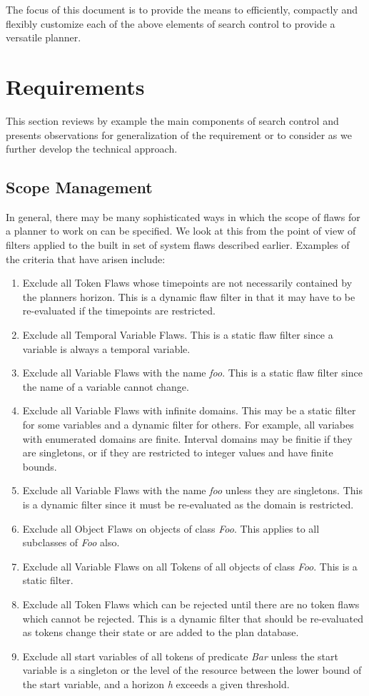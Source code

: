 \documentclass[10pt, letterpaper, twoside]{article}
\begin{document}
The focus of this document is to provide the means to efficiently, compactly and flexibly customize each of the above elements of search control to provide a versatile planner.

\section{Requirements}
This section reviews by example the main components of search control and presents observations for generalization of the requirement or to consider as we further develop the technical approach.

\subsection{Scope Management}
In general, there may be many sophisticated ways in which the scope of flaws for a planner to work on can be specified. We look at this from the point of view of filters applied to the built in set of system flaws described earlier. Examples of the criteria that have arisen include:
\begin{enumerate}
\item Exclude all Token Flaws whose timepoints are not necessarily contained by the planners horizon. This is a dynamic flaw filter in that it may have to be re-evaluated if the timepoints are restricted.
\item Exclude all Temporal Variable Flaws. This is a static flaw filter since a variable is always a temporal variable.
\item Exclude all Variable Flaws with the name {\em foo}. This is a static flaw filter since the name of a variable cannot change.
\item Exclude all Variable Flaws with infinite domains. This may be a static filter for some variables and a dynamic filter for others. For example, all variabes with enumerated domains are finite. Interval domains may be finitie if they are singletons, or if they are restricted to integer values and have finite bounds.
\item Exclude all Variable Flaws with the name {\em foo} unless they are singletons. This is a dynamic filter since it must be re-evaluated as the domain is restricted.
\item Exclude all Object Flaws on objects of class {\em Foo}. This applies to all subclasses of {\em Foo} also.
\item Exclude all Variable Flaws on all Tokens of all objects of class {\em Foo}. This is a static filter.
\item Exclude all Token Flaws which can be rejected until there are no token flaws which cannot be rejected. This is a dynamic filter that should be re-evaluated as tokens change their state or are added to the plan database.
\item Exclude all start variables of all tokens of predicate {\em Bar} unless the start variable is a singleton or the level of the resource between the lower bound of the start variable, and a horizon {\em h} exceeds a given threshold.
\end{enumerate}
\end{document}
